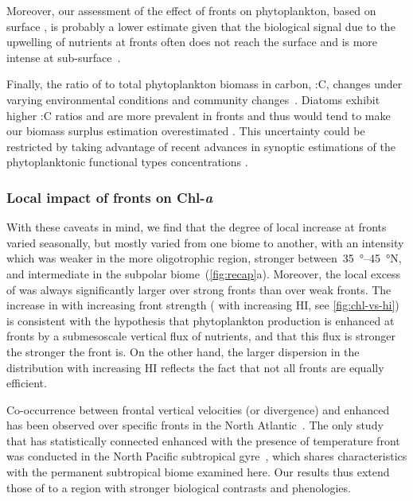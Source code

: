 Moreover, our assessment of the effect of fronts on phytoplankton, based on surface , is probably a lower estimate given that the biological signal due to the upwelling of nutrients at fronts often does not reach the surface and is more intense at sub-surface~\parencite{mourino_2004, ruiz_2019}.

Finally, the ratio of  to total phytoplankton biomass in carbon, :C, changes under varying environmental conditions and community changes~\parencite{behrenfeld_2015, halsey_2015, inomura_2022}.
Diatoms exhibit higher :C ratios and are more prevalent in fronts and thus would tend to make our biomass surplus estimation overestimated \parencite{treguer_2018}.
This uncertainty could be restricted by taking advantage of recent advances in synoptic estimations of the phytoplanktonic functional types concentrations \parencite{elhourany_2019}.

\subsubsection{Local impact of fronts on Chl-\textit{a}}

With these caveats in mind, we find that the degree of local  increase at fronts varied seasonally, but mostly varied from one biome to another, with an intensity which was weaker in the more oligotrophic region, stronger between~\qtyrange{35}{45}{\degree}N, and intermediate in the subpolar biome~(\cref{fig:recap}a).
Moreover, the local excess of  was always significantly larger over strong fronts than over weak fronts.
The increase in  with increasing front strength ( with increasing HI, see \cref{fig:chl-vs-hi}) is consistent with the hypothesis that phytoplankton production is enhanced at fronts by a submesoscale vertical flux of nutrients, and that this flux is stronger the stronger the front is.
On the other hand, the larger dispersion in the  distribution with increasing HI reflects the fact that not all fronts are equally efficient.

Co-occurrence between frontal vertical velocities (or divergence) and enhanced  has been observed over specific fronts in the North Atlantic~\parencite{mourino_2004, allen_2005, lehahn_2007}.
The only study that has statistically connected enhanced  with the presence of temperature front was conducted in the North Pacific subtropical gyre~\parencite{liu_2016}, which shares characteristics with the permanent subtropical biome examined here.
Our results thus extend those of \textcite{liu_2016} to a region with stronger biological contrasts and phenologies.

